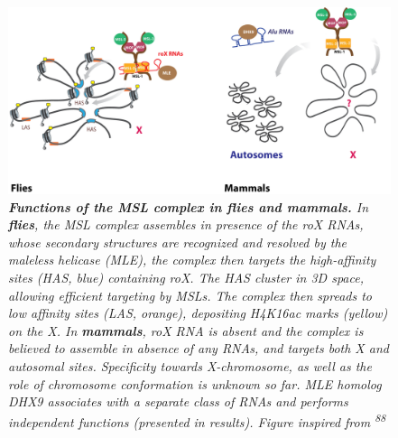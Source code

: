 \documentclass[11pt,twoside]{MPIthesis}
\theoremstyle{definition}
\theoremstyle{definition}
\theoremstyle{definition}
\theoremstyle{remark}
\begin{document}
\clearpage
\begin{figure}

{\centering \includegraphics[width=0.9\linewidth]{figures/intro_fig3} 

}

\caption[Functions of the MSL complex in flies and mammals]{\emph{\textbf{Functions of the MSL complex in flies and
mammals.} In \textbf{flies}, the MSL complex assembles in presence of
the roX RNAs, whose secondary structures are recognized and resolved by
the maleless helicase (MLE), the complex then targets the high-affinity
sites (HAS, blue) containing roX. The HAS cluster in 3D space, allowing
efficient targeting by MSLs. The complex then spreads to low affinity
sites (LAS, orange), depositing H4K16ac marks (yellow) on the X. In
\textbf{mammals}, roX RNA is absent and the complex is believed to
assemble in absence of any RNAs, and targets both X and autosomal sites.
Specificity towards X-chromosome, as well as the role of chromosome
conformation is unknown so far. MLE homolog DHX9 associates with a
separate class of RNAs and performs independent functions (presented in
results). Figure inspired from \textsuperscript{88}}}\label{fig:unnamed-chunk-3}
\end{figure}
\end{document}
